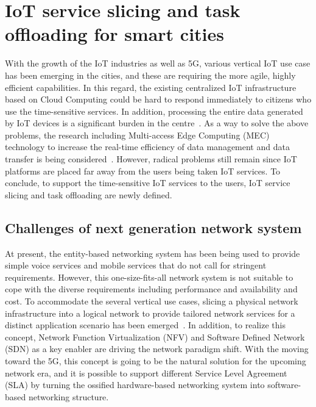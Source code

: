 \section{IoT service slicing and task offloading for smart cities} 
\label{sec:smartcity_edge}
With the growth of the IoT industries as well as 5G, various vertical IoT use case has been emerging in the cities, and these are requiring the more agile, highly efficient capabilities. In this regard, the existing centralized IoT infrastructure based on Cloud Computing could be hard to respond immediately to citizens who use the time-sensitive services. In addition, processing the entire data generated by IoT devices is a significant burden in the centre~\cite{chen2017enabling}. As a way to solve the above problems, the research including Multi-access Edge Computing (MEC) technology to increase the real-time efficiency of data management and data transfer is being considered~\cite{wang2018network}. However, radical problems still remain since IoT platforms are placed far away from the users being taken IoT services. To conclude, to support the time-sensitive IoT services to the users, IoT service slicing and task offloading are newly defined.

\subsection{Challenges of next generation network system}
At present, the entity-based networking system has been being used to provide simple voice services and mobile services that do not call for stringent requirements. However, this one-size-fits-all network system is not suitable to cope with the diverse requirements including performance and availability and cost. To accommodate the several vertical use cases, slicing a physical network infrastructure into a logical network to provide tailored network services for a distinct application scenario has been emerged~\cite{zhang2019overview}. In addition, to realize this concept, Network Function Virtualization (NFV) and Software Defined Network (SDN) as a key enabler are driving the network paradigm shift. With the moving toward the 5G, this concept is going to be the natural solution for the upcoming network era, and it is possible to support different Service Level Agreement (SLA) by turning the ossified hardware-based networking system into software-based networking structure.

